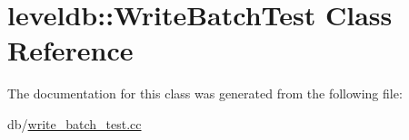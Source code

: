 \hypertarget{classleveldb_1_1_write_batch_test}{\section{leveldb\-:\-:Write\-Batch\-Test Class Reference}
\label{classleveldb_1_1_write_batch_test}
}


The documentation for this class was generated from the following file\-:\begin{DoxyCompactItemize}
\item 
db/\hyperlink{write__batch__test_8cc}{write\-\_\-batch\-\_\-test.\-cc}\end{DoxyCompactItemize}
